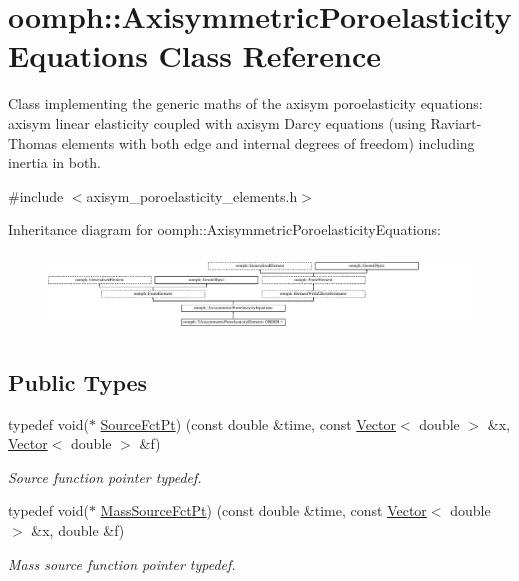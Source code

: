 \hypertarget{classoomph_1_1AxisymmetricPoroelasticityEquations}{}\section{oomph\+:\+:Axisymmetric\+Poroelasticity\+Equations Class Reference}
\label{classoomph_1_1AxisymmetricPoroelasticityEquations}


Class implementing the generic maths of the axisym poroelasticity equations\+: axisym linear elasticity coupled with axisym Darcy equations (using Raviart-\/\+Thomas elements with both edge and internal degrees of freedom) including inertia in both.  




{\ttfamily \#include $<$axisym\+\_\+poroelasticity\+\_\+elements.\+h$>$}

Inheritance diagram for oomph\+:\+:Axisymmetric\+Poroelasticity\+Equations\+:\begin{figure}[H]
\begin{center}
\leavevmode
\includegraphics[height=2.114804cm]{classoomph_1_1AxisymmetricPoroelasticityEquations}
\end{center}
\end{figure}
\subsection*{Public Types}
\begin{DoxyCompactItemize}
\item 
typedef void($\ast$ \hyperlink{classoomph_1_1AxisymmetricPoroelasticityEquations_a7a2c87557c3d9d405bb07a9f53bb4abe}{Source\+Fct\+Pt}) (const double \&time, const \hyperlink{classoomph_1_1Vector}{Vector}$<$ double $>$ \&x, \hyperlink{classoomph_1_1Vector}{Vector}$<$ double $>$ \&f)
\begin{DoxyCompactList}\small\item\em Source function pointer typedef. \end{DoxyCompactList}\item 
typedef void($\ast$ \hyperlink{classoomph_1_1AxisymmetricPoroelasticityEquations_a4f2fe2e03df9328898e9932b09299655}{Mass\+Source\+Fct\+Pt}) (const double \&time, const \hyperlink{classoomph_1_1Vector}{Vector}$<$ double $>$ \&x, double \&f)
\begin{DoxyCompactList}\small\item\em Mass source function pointer typedef. \end{DoxyCompactList}\end{DoxyCompactItemize}
